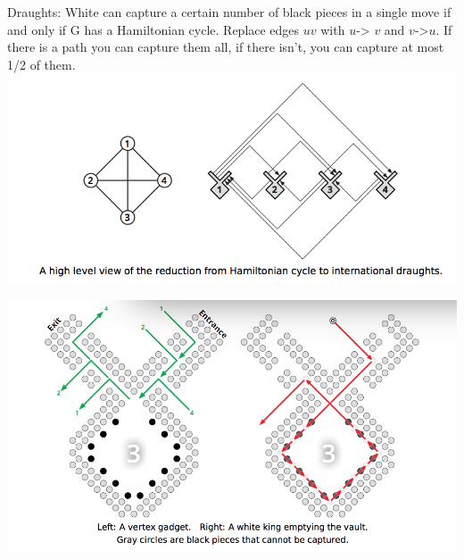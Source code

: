 Draughts: White can capture a certain number of black pieces in a single move if and only if G has a Hamiltonian cycle. Replace edges $uv$ with  $u$-> $v$ and $v$->$u$. If there is a path you can capture them all, if there isn't, you can capture at most 1/2 of them.
\includegraphics[width=\linewidth]{images/draughtssmall.png}

\includegraphics[width=\linewidth]{images/draughts.png}
